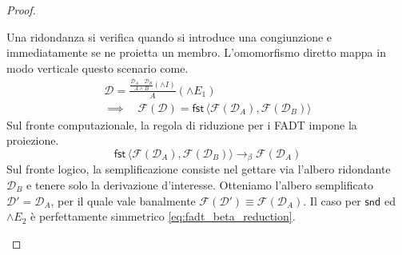 \begin{proof}
\begin{description}[leftmargin=1.5em, style=nextline, font=\bfseries]
        \item[Frammento Prodotto ($\land$ / $\times$)]
            Una ridondanza si verifica quando si introduce una congiunzione e immediatamente se ne proietta un membro. L'omomorfismo diretto mappa 
            in modo verticale questo scenario come.
            \begin{gather*}
                \mathcal{D} = \frac{\frac{\mathcal{D}_A \quad \mathcal{D}_B}{A \land B} (\land I)}{A} (\land E_1) \\[10pt]
                \implies \quad \mathcal{F}(\mathcal{D}) = \mathsf{fst} \, \langle \mathcal{F}(\mathcal{D}_A), \mathcal{F}(\mathcal{D}_B) \rangle
            \end{gather*}
            Sul fronte computazionale, la regola di riduzione per i FADT impone la proiezione.
            $$ \mathsf{fst} \, \langle \mathcal{F}(\mathcal{D}_A), \mathcal{F}(\mathcal{D}_B) \rangle \to_\beta \mathcal{F}(\mathcal{D}_A) $$
            Sul fronte logico, la semplificazione consiste nel gettare via l'albero ridondante $\mathcal{D}_B$ e tenere solo la derivazione d'interesse. Otteniamo l'albero 
            semplificato $\mathcal{D}' = \mathcal{D}_A$, per il quale vale banalmente $\mathcal{F}(\mathcal{D}') \equiv \mathcal{F}(\mathcal{D}_A)$. Il caso per $\mathsf{snd}$ 
            ed $\land E_2$ è perfettamente simmetrico \ref{eq:fadt_beta_reduction}.


\end{description}
\end{proof}
